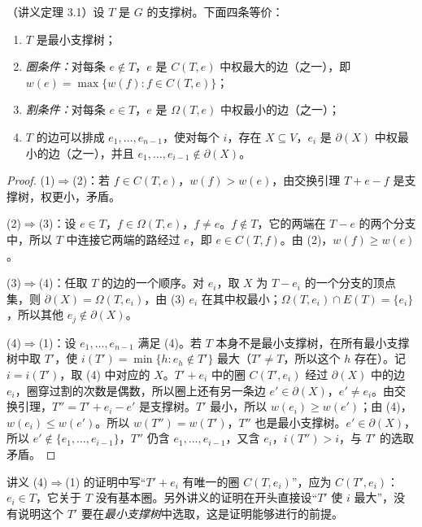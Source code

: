 \begin{theorem}\label{thm:mst-kruskal:optimality}
（讲义定理 3.1）设 $T$ 是 $G$ 的支撑树。下面四条等价：
\begin{enumerate}
\item[(1)] $T$ 是最小支撑树；
\item[(2)] \emph{圈条件：}对每条 $e\notin T$，$e$ 是 $C(T,e)$ 中权最大的边（之一），即 $w(e)=\max\{w(f):f\in C(T,e)\}$；
\item[(3)] \emph{割条件：}对每条 $e\in T$，$e$ 是 $\Omega(T,e)$ 中权最小的边（之一）；
\item[(4)] $T$ 的边可以排成 $e_1,\dots,e_{n-1}$，使对每个 $i$，存在 $X\subseteq V$，$e_i$ 是 $\partial(X)$ 中权最小的边（之一），并且 $e_1,\dots,e_{i-1}\notin\partial(X)$。
\end{enumerate}
\end{theorem}
\begin{proof}
(1)$\Rightarrow$(2)：若 $f\in C(T,e)$，$w(f)>w(e)$，由交换引理 $T+e-f$ 是支撑树，权更小，矛盾。

(2)$\Rightarrow$(3)：设 $e\in T$，$f\in\Omega(T,e)$，$f\neq e$。$f\notin T$，它的两端在 $T-e$ 的两个分支中，所以 $T$ 中连接它两端的路经过 $e$，即 $e\in C(T,f)$。由 (2)，$w(f)\geqslant w(e)$。

(3)$\Rightarrow$(4)：任取 $T$ 的边的一个顺序。对 $e_i$，取 $X$ 为 $T-e_i$ 的一个分支的顶点集，则 $\partial(X)=\Omega(T,e_i)$，由 (3) $e_i$ 在其中权最小；$\Omega(T,e_i)\cap E(T)=\{e_i\}$，所以其他 $e_j\notin\partial(X)$。

(4)$\Rightarrow$(1)：设 $e_1,\dots,e_{n-1}$ 满足 (4)。若 $T$ 本身不是最小支撑树，在所有最小支撑树中取 $T'$，使 $i(T')=\min\{h:e_h\notin T'\}$ 最大（$T'\neq T$，所以这个 $h$ 存在）。记 $i=i(T')$，取 (4) 中对应的 $X$。$T'+e_i$ 中的圈 $C(T',e_i)$ 经过 $\partial(X)$ 中的边 $e_i$，圈穿过割的次数是偶数，所以圈上还有另一条边 $e'\in\partial(X)$，$e'\neq e_i$。由交换引理，$T''=T'+e_i-e'$ 是支撑树。$T'$ 最小，所以 $w(e_i)\geqslant w(e')$；由 (4)，$w(e_i)\leqslant w(e')$。所以 $w(T'')=w(T')$，$T''$ 也是最小支撑树。$e'\in\partial(X)$，所以 $e'\notin\{e_1,\dots,e_{i-1}\}$，$T''$ 仍含 $e_1,\dots,e_{i-1}$，又含 $e_i$，$i(T'')>i$，与 $T'$ 的选取矛盾。
\end{proof}

\begin{remark}[讲义的笔误]
讲义 (4)$\Rightarrow$(1) 的证明中写“$T'+e_i$ 有唯一的圈 $C(T,e_i)$”，应为 $C(T',e_i)$：$e_i\in T$，它关于 $T$ 没有基本圈。另外讲义的证明在开头直接设“$T'$ 使 $i$ 最大”，没有说明这个 $T'$ 要在\emph{最小支撑树}中选取，这是证明能够进行的前提。
\end{remark}


